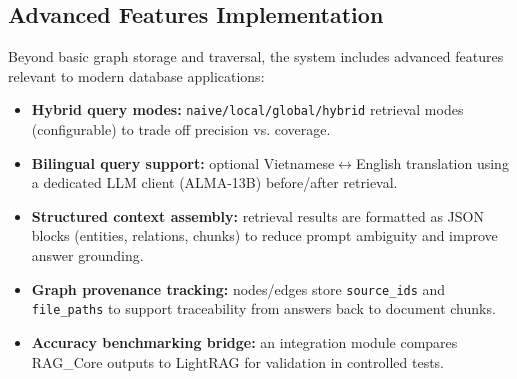 \subsection{Advanced Features Implementation}
Beyond basic graph storage and traversal, the system includes advanced features relevant to modern database applications:
\begin{itemize}
    \item \textbf{Hybrid query modes:} \texttt{naive/local/global/hybrid} retrieval modes (configurable) to trade off precision vs. coverage.
    \item \textbf{Bilingual query support:} optional Vietnamese$\leftrightarrow$English translation using a dedicated LLM client (ALMA-13B) before/after retrieval.
    \item \textbf{Structured context assembly:} retrieval results are formatted as JSON blocks (entities, relations, chunks) to reduce prompt ambiguity and improve answer grounding.
    \item \textbf{Graph provenance tracking:} nodes/edges store \texttt{source\_ids} and \texttt{file\_paths} to support traceability from answers back to document chunks.
    \item \textbf{Accuracy benchmarking bridge:} an integration module compares RAG\_Core outputs to LightRAG for validation in controlled tests.
\end{itemize}